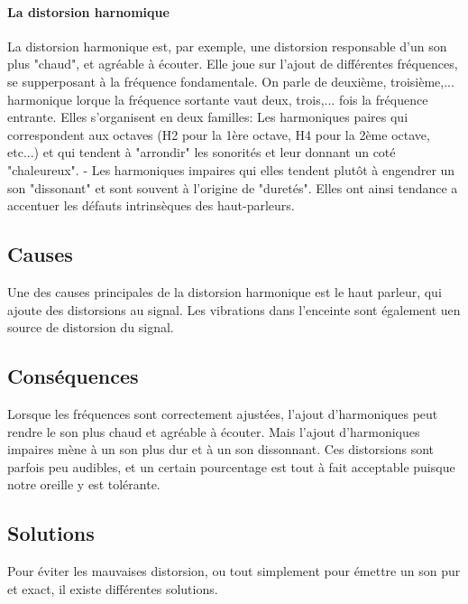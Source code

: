 \documentclass{article}
\begin{document}
\paragraph{La distorsion harnomique}La distorsion harmonique est, par exemple, une distorsion responsable d'un son plus "chaud", et agréable à écouter. Elle joue sur l'ajout de différentes fréquences, se supperposant à la fréquence fondamentale. On parle de deuxième, troisième,... harmonique lorque la fréquence sortante vaut deux, trois,... fois la fréquence entrante.
Elles s'organisent en deux familles: Les harmoniques paires qui correspondent aux octaves (H2 pour la 1ère octave, H4 pour la 2ème octave, etc...) et qui tendent à "arrondir" les sonorités et leur donnant un coté "chaleureux".
- Les harmoniques impaires qui elles tendent plutôt à engendrer un son "dissonant" et sont souvent à l'origine de "duretés". Elles ont ainsi tendance a accentuer les défauts intrinsèques des haut-parleurs.

\subsection{Causes}
Une des causes principales de la distorsion harmonique est le haut parleur, qui ajoute des distorsions au signal. Les vibrations dans l'enceinte sont également uen source de distorsion du signal.



\subsection{Conséquences}
Lorsque les fréquences sont correctement ajustées, l'ajout d'harmoniques peut rendre le son plus chaud et agréable à écouter. Mais l'ajout d'harmoniques impaires mène à un son plus dur et à un son dissonnant.
Ces distorsions sont parfois peu audibles, et un certain pourcentage est tout à fait acceptable puisque notre oreille y est tolérante.


\subsection{Solutions}
Pour éviter les mauvaises distorsion, ou tout simplement pour émettre un son pur et exact, il existe différentes solutions.


\end{document}
